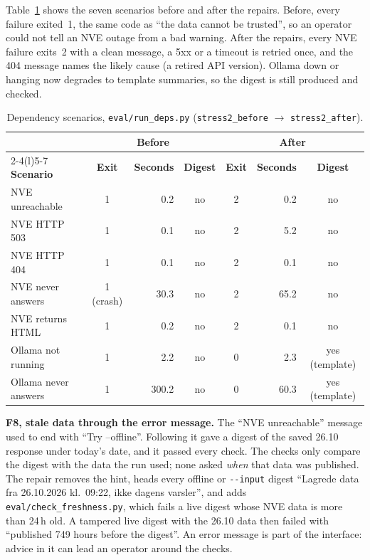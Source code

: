 \documentclass{article}
\newcommand{\code}[1]{\texttt{#1}}
\begin{document}
Table~\ref{tab:deps} shows the seven scenarios before and after the repairs. Before, every failure exited~1, the same code as ``the data cannot be trusted'', so an operator could not tell an NVE outage from a bad warning. After the repairs, every NVE failure exits~2 with a clean message, a 5xx or a timeout is retried once, and the 404 message names the likely cause (a retired API version). Ollama down or hanging now degrades to template summaries, so the digest is still produced and checked.

\begin{table}[htbp]
\centering
\small
\caption{Dependency scenarios, \code{eval/run\_deps.py} (\code{stress2\_before} $\rightarrow$ \code{stress2\_after}).}
\label{tab:deps}
\begin{tabular}{@{}l c r c c r c@{}}
\toprule
 & \multicolumn{3}{c}{\textbf{Before}} & \multicolumn{3}{c}{\textbf{After}} \\
\cmidrule(lr){2-4}\cmidrule(l){5-7}
\textbf{Scenario} & \textbf{Exit} & \textbf{Seconds} & \textbf{Digest} & \textbf{Exit} & \textbf{Seconds} & \textbf{Digest} \\
\midrule
NVE unreachable & 1 & 0.2 & no & 2 & 0.2 & no \\
NVE HTTP 503 & 1 & 0.1 & no & 2 & 5.2 & no \\
NVE HTTP 404 & 1 & 0.1 & no & 2 & 0.1 & no \\
NVE never answers & 1 (crash) & 30.3 & no & 2 & 65.2 & no \\
NVE returns HTML & 1 & 0.2 & no & 2 & 0.1 & no \\
Ollama not running & 1 & 2.2 & no & 0 & 2.3 & yes (template) \\
Ollama never answers & 1 & 300.2 & no & 0 & 60.3 & yes (template) \\
\bottomrule
\end{tabular}
\end{table}

\textbf{F8, stale data through the error message.} The ``NVE unreachable'' message used to end with ``Try --offline''. Following it gave a digest of the saved 26.10 response under today's date, and it passed every check. The checks only compare the digest with the data the run used; none asked \emph{when} that data was published. The repair removes the hint, heads every offline or \code{-{}-input} digest ``Lagrede data fra 26.10.2026 kl.~09:22, ikke dagens varsler'', and adds \code{eval/check\_freshness.py}, which fails a live digest whose NVE data is more than 24\,h old. A tampered live digest with the 26.10 data then failed with ``published 749 hours before the digest''. An error message is part of the interface: advice in it can lead an operator around the checks.
\end{document}
